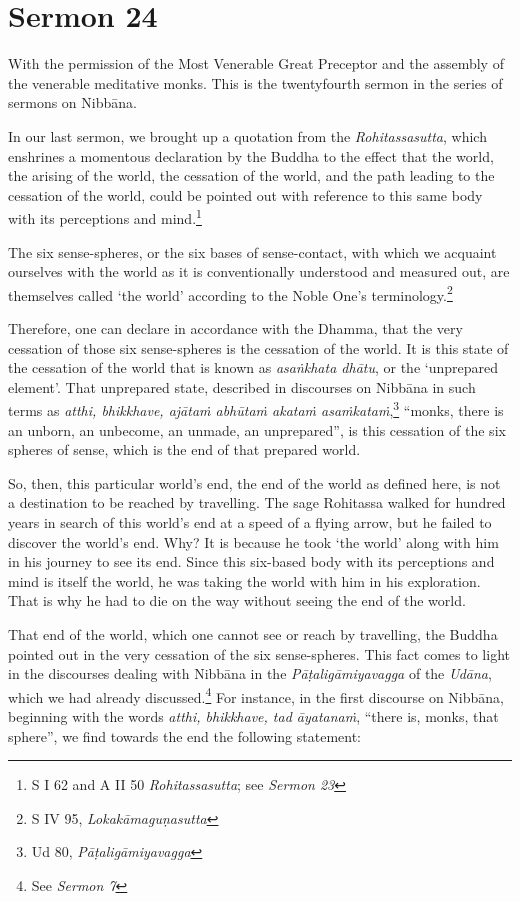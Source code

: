 \chapter{Sermon 24}

\NibbanaOpeningQuote

With the permission of the Most Venerable Great Preceptor and the assembly of the venerable meditative monks. This is the twentyfourth sermon in the series of sermons on Nibbāna.

In our last sermon, we brought up a quotation from the \emph{Rohitassasutta}, which enshrines a momentous declaration by the Buddha to the effect that the world, the arising of the world, the cessation of the world, and the path leading to the cessation of the world, could be pointed out with reference to this same body with its perceptions and mind.\footnote{S I 62 and A II 50 \emph{Rohitassasutta}; see \emph{Sermon 23}}

The six sense-spheres, or the six bases of sense-contact, with which we acquaint ourselves with the world as it is conventionally understood and measured out, are themselves called `the world' according to the Noble One's terminology.\footnote{S IV 95, \emph{Lokakāmaguṇasutta}}

Therefore, one can declare in accordance with the Dhamma, that the very cessation of those six sense-spheres is the cessation of the world. It is this state of the cessation of the world that is known as \emph{asaṅkhata dhātu}, or the `unprepared element'. That unprepared state, described in discourses on Nibbāna in such terms as \emph{atthi, bhikkhave, ajātaṁ abhūtaṁ akataṁ asaṁkataṁ},\footnote{Ud 80, \emph{Pāṭaligāmiyavagga}} ``monks, there is an unborn, an unbecome, an unmade, an unprepared'', is this cessation of the six spheres of sense, which is the end of that prepared world.

So, then, this particular world's end, the end of the world as defined here, is not a destination to be reached by travelling. The sage Rohitassa walked for hundred years in search of this world's end at a speed of a flying arrow, but he failed to discover the world's end. Why? It is because he took `the world' along with him in his journey to see its end. Since this six-based body with its perceptions and mind is itself the world, he was taking the world with him in his exploration. That is why he had to die on the way without seeing the end of the world.

That end of the world, which one cannot see or reach by travelling, the Buddha pointed out in the very cessation of the six sense-spheres. This fact comes to light in the discourses dealing with Nibbāna in the \emph{Pāṭaligāmiyavagga} of the \emph{Udāna}, which we had already discussed.\footnote{See \emph{Sermon 7}} For instance, in the first discourse on Nibbāna, beginning with the words \emph{atthi, bhikkhave, tad āyatanaṁ}, ``there is, monks, that sphere'', we find towards the end the following statement:

